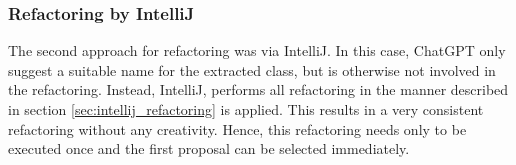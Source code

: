 \begin{comment}
For each combination of the weights described above, the five most-scored data clumps were manually reviewed. After that, one particular data clumps was  chosen from all combination. The criteria for selecting this data clump was more subjective as it is difficult to determine which data clump would be  the most relevant to refactor. The following considerations influence the filtering process.

\begin{itemize}
    \item Avoid data clumps that affect abstract classes or interfaces as they should not be changed.
    \item Avoid data clumps that only affect source code for unit testing. While refactoring source code for tests is very important too, data clumps in the main code are regarded more important for the purpose of this thesis.
    \item Whether the combination of the parameters would make logically sense. for instance, are the fields or parameters in similar domains or are they used together. 
    \item In case of fields, potentials issues that occur if dependency injection is used because moving these fields require special attention that is outside the scope of this master thesis
\end{itemize}
All these criteria are more guidelines than strict requirement to allow flexibility 
After considering all of these criteria, one final data clump was selected.
\subsection{Refactoring process}


\end{comment}
\subsubsection{Refactoring by IntelliJ}

The second approach for refactoring was via IntelliJ. In this case, ChatGPT only suggest a suitable name for the extracted class, but is otherwise not involved in the refactoring. Instead, IntelliJ, performs all refactoring in the manner described in section  \ref{sec:intellij_refactoring} is applied. This results in a very consistent refactoring without any creativity. Hence, this refactoring needs only to be executed once and the first proposal can be selected immediately. 


